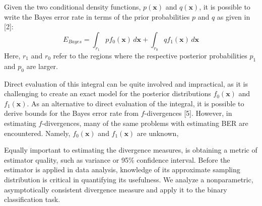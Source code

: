 \documentclass{article}
\begin{document}
	Given the two conditional density functions, $p(\textbf{x})$ and $q(\textbf{x})$, it is possible to write the Bayes error rate in terms of the prior probabilities $p$ and $q$ as given in [2]:
	\begin{equation} E_{Bayes}=\int_{r_1} pf_0(\textbf{x}) \,d\textbf{x} + \int_{r_0} qf_1(\textbf{x}) \,d\textbf{x} \end{equation}
	Here, $r_1$ and $r_0$ refer to the regions where the respective posterior probabilities $p_1$ and $p_0$ are larger.
	
	
	Direct evaluation of this integral can be quite involved and impractical, as it is challenging to create an exact model for the posterior distributions $f_0(\textbf{x})$ and $f_1(\textbf{x})$. As an alternative to direct evaluation of the integral, it is possible to derive bounds for the Bayes error rate from $f$-divergences [5]. However, in estimating $f$-divergences, many of the same problems with estimating BER are encountered. Namely, $f_0(\textbf{x})$ and $f_1(\textbf{x})$ are unknown, 
	
	
	
	Equally important to estimating the divergence measures, is obtaining a metric of estimator quality, such as variance or 95\% confidence interval. Before the estimator is applied in data analysis, knowledge of its approximate sampling distribution is critical in quantifying its usefulness. We analyze a nonparametric, asymptotically consistent divergence measure and apply it to the binary classification task.
	
	
\end{document}
